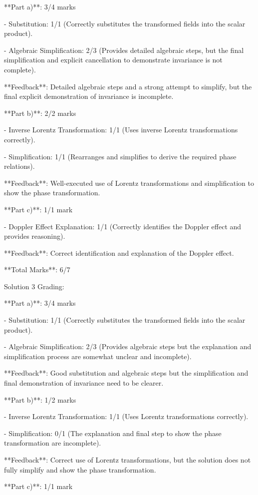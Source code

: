 \documentclass[a4paper,11pt]{article}
\begin{document}
**Part a)**: 3/4 marks

- Substitution: 1/1 (Correctly substitutes the transformed fields into the scalar product).

- Algebraic Simplification: 2/3 (Provides detailed algebraic steps, but the final simplification and explicit cancellation to demonstrate invariance is not complete).

**Feedback**: Detailed algebraic steps and a strong attempt to simplify, but the final explicit demonstration of invariance is incomplete.

**Part b)**: 2/2 marks

- Inverse Lorentz Transformation: 1/1 (Uses inverse Lorentz transformations correctly).

- Simplification: 1/1 (Rearranges and simplifies to derive the required phase relations).

**Feedback**: Well-executed use of Lorentz transformations and simplification to show the phase transformation.

**Part c)**: 1/1 mark

- Doppler Effect Explanation: 1/1 (Correctly identifies the Doppler effect and provides reasoning).

**Feedback**: Correct identification and explanation of the Doppler effect.

**Total Marks**: 6/7

Solution 3 Grading:

**Part a)**: 3/4 marks

- Substitution: 1/1 (Correctly substitutes the transformed fields into the scalar product).

- Algebraic Simplification: 2/3 (Provides algebraic steps but the explanation and simplification process are somewhat unclear and incomplete).

**Feedback**: Good substitution and algebraic steps but the simplification and final demonstration of invariance need to be clearer.

**Part b)**: 1/2 marks

- Inverse Lorentz Transformation: 1/1 (Uses Lorentz transformations correctly).

- Simplification: 0/1 (The explanation and final step to show the phase transformation are incomplete).

**Feedback**: Correct use of Lorentz transformations, but the solution does not fully simplify and show the phase transformation.

**Part c)**: 1/1 mark
\end{document}
